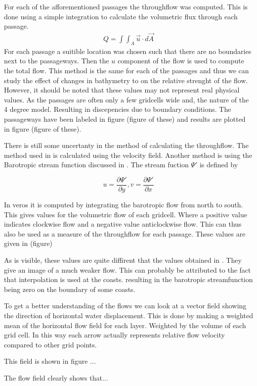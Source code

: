 For each of the afforementioned passages the throughflow was computed. This is done using a simple integration to calculate the volumetric flux through each passage.
\begin{align}
	Q = \int \int_A \vec{u} \cdot d\vec{A}
\end{align}	
For each passage a suitible location was chosen such that there are no boundaries next to the passageways. Then the $u$ component of the flow is used to compute the total flow. This method is the same for each of the passages and thus we can study the effect of changes in bathymetry to on the relative strenght of the flow. However, it should be noted that these values may not represent real physical values. As the passages are often only a few gridcells wide and, the nature of the 4 degree model. Resulting in discepencies due to boundary conditions. The passageways have been labeled in figure (figure of these) and results are plotted in figure (figure of these).


There is still some uncertanty in the method of calculating the throughflow. The method used in  is calculated using the velocity field. Another method is using the Barotropic stream function discussed in . The stream fuction $\Psi'$ is defined by


$$
u = \frac{\partial \Psi'}{\partial y}, v = \frac{\partial \Psi'}{\partial x}
$$

In veros it is computed by integrating the barotropic flow from north to south. This gives values for the volumetric flow of each gridcell. Where a positive value indicates clockwise flow and a negative value anticlockwise flow. This can thus also be used as a measure of the throughflow for each passage. These values are given in (figure)

As is visible, these values are quite diffirent that the values obtained in .
They give an image of a much weaker flow. This can probably be attributed to the fact that interpolation is used at the coasts. resulting in the barotropic streamfunction being zero on the boundary of some coasts.


To get a better understanding of the flows we can look at a vector field showing the direction of horizontal water displacement. This is done by making a weighted mean of the horizontal flow field for each layer. Weighted by the volume of each grid cell. In this way each arrow actually represents relative flow velocity compared to other grid points.

This field is shown in figure ...


The flow field clearly shows that...